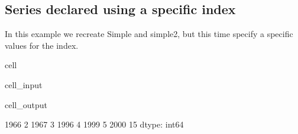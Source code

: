 \documentclass[letterpaper,10pt,english]{jupyterBook}
\begin{document}
\subsection{Series declared using a specific index}
\label{\detokenize{content/04_PythonEssentials/PythonPackagesEtc:series-declared-using-a-specific-index}}
\sphinxAtStartPar
In this example we re\sphinxhyphen{}create Simple and simple2, but this time specify a specific values for the index.

\begin{sphinxuseclass}{cell}\begin{sphinxVerbatimInput}

\begin{sphinxuseclass}{cell_input}
\begin{sphinxVerbatim}[commandchars=\\\{\}]
\PYG{p}{[}\PYG{p}{]}\PYG{p}{[}\PYG{p}{]}
\end{sphinxVerbatim}

\end{sphinxuseclass}\end{sphinxVerbatimInput}
\begin{sphinxVerbatimOutput}

\begin{sphinxuseclass}{cell_output}
\begin{sphinxVerbatim}[commandchars=\\\{\}]
1966     2
1967     3
1996     4
1999     5
2000   \PYGZhy{}15
dtype: int64
\end{sphinxVerbatim}

\end{sphinxuseclass}\end{sphinxVerbatimOutput}

\end{sphinxuseclass}
\end{document}
